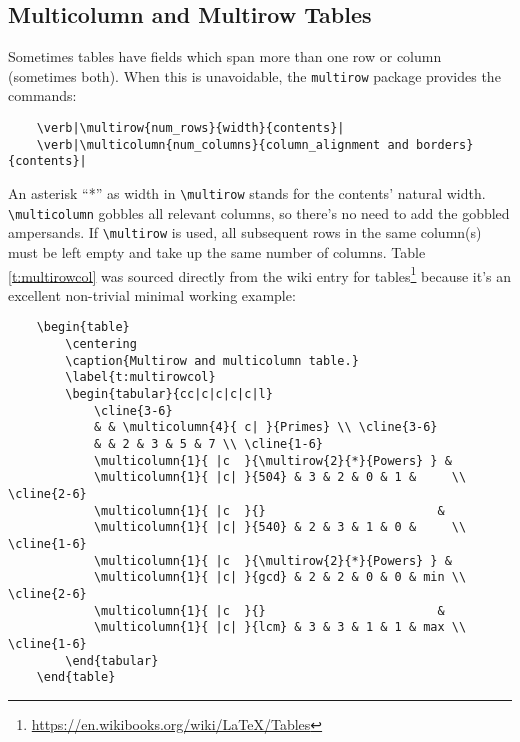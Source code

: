 \subsection{Multicolumn and Multirow Tables}
%
Sometimes tables have fields which span more than one row or column
(sometimes both).  When this is unavoidable, the \verb|multirow|
package provides the commands:
\begin{verbatim}
	\verb|\multirow{num_rows}{width}{contents}|
	\verb|\multicolumn{num_columns}{column_alignment and borders}{contents}|
\end{verbatim}
An asterisk ``*'' as width in \verb|\multirow| stands for the
contents' natural width.  \verb|\multicolumn| gobbles all relevant
columns, so there's no need to add the gobbled ampersands.  If
\verb|\multirow| is used, all subsequent rows in the same column(s)
must be left empty and take up the same number of columns.  Table
\ref{t:multirowcol} was sourced directly from the wiki entry for
tables\footnote{\url{https://en.wikibooks.org/wiki/LaTeX/Tables}}
because it's an excellent non-trivial minimal working example:
\begin{verbatim}
	\begin{table}
	    \centering
	    \caption{Multirow and multicolumn table.}
	    \label{t:multirowcol}
	    \begin{tabular}{cc|c|c|c|c|l}
	        \cline{3-6}
	        & & \multicolumn{4}{ c| }{Primes} \\ \cline{3-6}
	        & & 2 & 3 & 5 & 7 \\ \cline{1-6}
	        \multicolumn{1}{ |c  }{\multirow{2}{*}{Powers} } &
	        \multicolumn{1}{ |c| }{504} & 3 & 2 & 0 & 1 &     \\ \cline{2-6}
	        \multicolumn{1}{ |c  }{}                        &
	        \multicolumn{1}{ |c| }{540} & 2 & 3 & 1 & 0 &     \\ \cline{1-6}
	        \multicolumn{1}{ |c  }{\multirow{2}{*}{Powers} } &
	        \multicolumn{1}{ |c| }{gcd} & 2 & 2 & 0 & 0 & min \\ \cline{2-6}
	        \multicolumn{1}{ |c  }{}                        &
	        \multicolumn{1}{ |c| }{lcm} & 3 & 3 & 1 & 1 & max \\ \cline{1-6}
	    \end{tabular}
	\end{table}
\end{verbatim}
